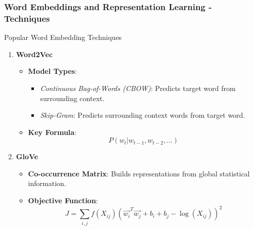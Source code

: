 \documentclass[aspectratio=169]{beamer}
\begin{document}
\begin{frame}[fragile]
    \frametitle{Word Embeddings and Representation Learning - Techniques}
    \begin{block}{Popular Word Embedding Techniques}
        \begin{enumerate}
            \item \textbf{Word2Vec}
            \begin{itemize}
                \item \textbf{Model Types}:
                \begin{itemize}
                    \item \textit{Continuous Bag-of-Words (CBOW)}: Predicts target word from surrounding context.
                    \item \textit{Skip-Gram}: Predicts surrounding context words from target word.
                \end{itemize}
                \item \textbf{Key Formula}:
                \begin{equation}
                    P(w_t | w_{t-1}, w_{t-2}, \ldots)
                \end{equation}
            \end{itemize}
            
            \item \textbf{GloVe}
            \begin{itemize}
                \item \textbf{Co-occurrence Matrix}: Builds representations from global statistical information.
                \item \textbf{Objective Function}:
                \begin{equation}
                    J = \sum_{i,j} f(X_{ij}) \left( \vec{w_i}^T \vec{w_j} + b_i + b_j - \log(X_{ij}) \right)^2
                \end{equation}
            \end{itemize}
        \end{enumerate}
    \end{block}
\end{frame}
\end{document}
